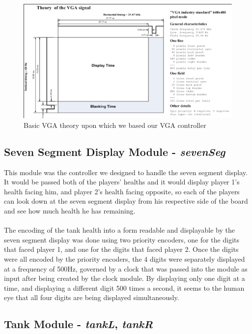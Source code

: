 \documentclass{article}
\begin{document}
\begin{figure}[H]
	\begin{center}
		\includegraphics[width=1\textwidth]{vgaTheory} 
		\caption{Basic VGA theory upon which we based our VGA controller}
	\end{center}
\end{figure}

\subsection*{Seven Segment Display Module - \textit{sevenSeg}}

This module was the controller we designed to handle the seven segment display.  It would be passed both of the players' healths and it would display player 1's health facing him, and player 2's health facing opposite, so each of the players can look down at the seven segment display from his respective side of the board and see how much health he has remaining. \\
\\
The encoding of the tank health into a form readable and displayable by the seven segment display was done using two priority encoders, one for the digits that faced player 1, and one for the digits that faced player 2.  Once the digits were all encoded by the priority encoders, the 4 digits were  separately displayed at a frequency of 500Hz, governed by a clock that was passed into the module as input after being created by the clock module.  By displaying only one digit at a time, and displaying a different digit 500 times a second, it seems to the human eye that all four digits are being displayed simultaneously.

\subsection*{Tank Module - \textit{tankL}, \textit{tankR}}
\end{document}
